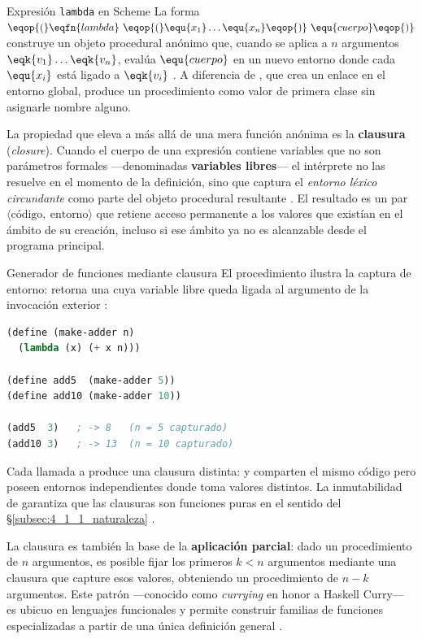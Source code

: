 \begin{definicion}{Expresión \texttt{lambda} en Scheme}
La forma $\eqop{(}\eqfn{lambda}\ \eqop{(}\equ{x_1} \dots \equ{x_n}\eqop{)}\ \equ{cuerpo}\eqop{)}$ construye un objeto procedural anónimo que, cuando se aplica a $n$ argumentos $\eqk{v_1} \dots \eqk{v_n}$, evalúa $\equ{cuerpo}$ en un nuevo entorno donde cada $\equ{x_i}$ está ligado a $\eqk{v_i}$ \cite{SICP}. A diferencia de , que crea un enlace en el entorno global,  produce un procedimiento como valor de primera clase sin asignarle nombre alguno.
\end{definicion}

La propiedad que eleva a  más allá de una mera función anónima es la \textbf{clausura} (\textit{closure}). Cuando el cuerpo de una expresión  contiene variables que no son parámetros formales —denominadas \textbf{variables libres}— el intérprete no las resuelve en el momento de la definición, sino que captura el \textit{entorno léxico circundante} como parte del objeto procedural resultante \cite{SICP, TAPL}. El resultado es un par $\langle \text{código},\ \text{entorno} \rangle$ que retiene acceso permanente a los valores que existían en el ámbito de su creación, incluso si ese ámbito ya no es alcanzable desde el programa principal.

\begin{ejemplo}{Generador de funciones mediante clausura}
El procedimiento  ilustra la captura de entorno: retorna una  cuya variable libre  queda ligada al argumento de la invocación exterior \cite{SICP}:
\begin{lstlisting}[language=Lisp, caption={Clausura: captura del entorno léxico}]
(define (make-adder n)
  (lambda (x) (+ x n)))

(define add5  (make-adder 5))
(define add10 (make-adder 10))

(add5  3)   ; -> 8   (n = 5 capturado)
(add10 3)   ; -> 13  (n = 10 capturado)
\end{lstlisting}
Cada llamada a  produce una clausura distinta:  y  comparten el mismo código pero poseen entornos independientes donde  toma valores distintos. La inmutabilidad de  garantiza que las clausuras son funciones puras en el sentido del §\ref{subsec:4_1_1_naturaleza} \cite{SICP}.
\end{ejemplo}

La clausura es también la base de la \textbf{aplicación parcial}: dado un procedimiento de $n$ argumentos, es posible fijar los primeros $k < n$ argumentos mediante una clausura que capture esos valores, obteniendo un procedimiento de $n - k$ argumentos. Este patrón —conocido como \textit{currying} en honor a Haskell Curry— es ubicuo en lenguajes funcionales y permite construir familias de funciones especializadas a partir de una única definición general \cite{SICP, PFPL}.

